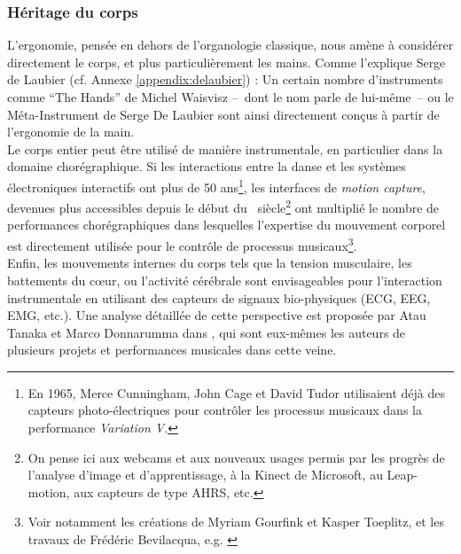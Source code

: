 \subsubsection{Héritage du corps}

\noindent L'ergonomie, pensée en dehors de l'organologie classique, nous amène à considérer directement le corps, et plus particulièrement les mains. Comme l'explique Serge de Laubier (cf. Annexe \ref{appendix:delaubier}) :  Un certain nombre d'instruments comme ``The Hands'' de Michel Waisvisz --~dont le nom parle de lui-même~-- ou le Méta-Instrument de Serge De Laubier sont ainsi directement conçus à partir de l'ergonomie de la main.\\
\indent Le corps entier peut être utilisé de manière instrumentale, en particulier dans la domaine chorégraphique. Si les interactions entre la danse et les systèmes électroniques interactifs ont plus de 50 ans\footnote{En 1965, Merce Cunningham, John Cage et David Tudor utilisaient déjà des capteurs photo-électriques pour contrôler les processus musicaux dans la performance \textit{Variation V}.}, les interfaces de \textit{motion capture}, devenues plus accessibles depuis le début du ~siècle\footnote{On pense ici aux webcams et aux nouveaux usages permis par les progrès de l'analyse d'image et d'apprentissage, à la Kinect de Microsoft, au Leap-motion, aux capteurs de type \gls{AHRS}, etc.} ont multiplié le nombre de performances chorégraphiques dans lesquelles l'expertise du mouvement corporel est directement utilisée pour le contrôle de processus musicaux\footnote{Voir notamment les créations de Myriam Gourfink et Kasper Toeplitz, et les travaux de Frédéric Bevilacqua, e.g. \cite{bevilacqua_gesture_2011}}.\\
\indent Enfin, les mouvements internes du corps tels que la tension musculaire, les battements du cœur, ou l'activité cérébrale sont envisageables pour l'interaction instrumentale en utilisant des capteurs de signaux bio-physiques (ECG, EEG, EMG, etc.). Une analyse détaillée de cette perspective est proposée par Atau Tanaka et Marco Donnarumma dans \cite{tanaka_body_2019}, qui sont eux-mêmes les auteurs de plusieurs projets et performances musicales dans cette veine.

